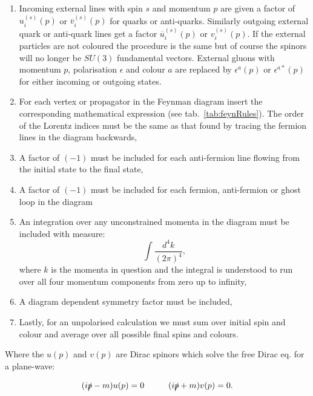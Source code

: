 	\begin{enumerate}
		\item Incoming external lines with spin $s$ and momentum $p$ are given a factor of $u^{(s)}_i(p)$ or
		      $\overline{v}^{(s)}_i(p)$ for quarks or anti-quarks.  Similarly outgoing external quark or
		      anti-quark lines get a factor $\overline{u}^{(s)}_i(p)$ or $v^{(s)}_i(p)$.  If the external particles
		      are not coloured the procedure is the same but of course the spinors will no longer be $SU(3)$
		      fundamental vectors.  External gluons with momentum $p$, polarisation $\epsilon$ and colour $a$ are
		      replaced by $\epsilon^a(p)$ or $\epsilon^{a*}(p)$ for either incoming or outgoing states.
		\item For each vertex or propagator in the Feynman diagram insert the corresponding mathematical
		      expression (see tab.~\eqref{tab:feynRules}).  The order of the Lorentz indices must be the same
		      as that found by tracing the fermion lines in the diagram backwards,
		\item A factor of $(-1)$ must be included for each anti-fermion line flowing from the initial state
		      to the final state,
		\item A factor of $(-1)$ must be included for each fermion, anti-fermion or ghost loop in the diagram
		\item An integration over any unconstrained momenta in the diagram must be included with measure:
		      \begin{equation}
		      	\int\frac{d^4k}{(2\pi)^4},
		      \end{equation}
		      where $k$ is the momenta in question and the integral is understood to run over all four momentum
		      components from zero up to infinity,
		\item A diagram dependent symmetry factor must be included,
		\item Lastly, for an unpolarised calculation we must sum over initial spin and colour and average
		      over all possible final spins and colours.
	\end{enumerate}

	Where the $u(p)$ and $v(p)$ are Dirac spinors which solve the free Dirac eq. for a plane-wave:

	\begin{equation}
		(i\slashed p - m)u(p)=0\hspace{1cm}(i\slashed p + m)v(p)=0.
		\label{eqn:diracPW}
	\end{equation}

